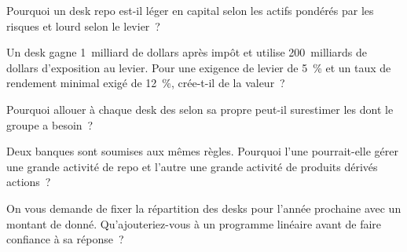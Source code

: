 \begin{interviewq}\label{iq:fm:the-bank-markets-division:2}
Pourquoi un desk repo est-il léger en capital selon les actifs pondérés par les risques et lourd selon le levier~?
\end{interviewq}

\begin{interviewq}\label{iq:fm:the-bank-markets-division:3}
Un desk gagne 1~milliard de dollars après impôt et utilise 200~milliards de dollars d'exposition au levier. Pour une exigence de levier de 5~\% et un taux de rendement minimal exigé de 12~\%, crée-t-il
de la valeur~?
\end{interviewq}

\begin{interviewq}\label{iq:fm:the-bank-markets-division:4}
Pourquoi allouer à chaque desk des  selon sa propre  peut-il surestimer les  dont le groupe a besoin~?
\end{interviewq}

\begin{interviewq}\label{iq:fm:the-bank-markets-division:5}
Deux banques sont soumises aux mêmes règles. Pourquoi l'une pourrait-elle gérer une grande activité de repo et l'autre une grande activité de produits dérivés actions~?
\end{interviewq}

\begin{interviewq}\label{iq:fm:the-bank-markets-division:6}
On vous demande de fixer la répartition des desks pour l'année prochaine avec un montant de  donné. Qu'ajouteriez-vous à un programme linéaire
avant de faire confiance à sa réponse~?
\end{interviewq}

